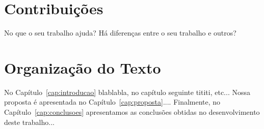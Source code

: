 \section{Contribuições}
\label{cap:introducao:sec:contribuicoes}

No que o seu trabalho ajuda? Há diferenças entre o seu trabalho e outros?

\section{Organização do Texto}
\label{cap:introducao:sec:organizacao:texto}

No Capítulo~\ref{cap:introducao} blablabla, no capítulo seguinte tititi, etc... Nossa proposta é apresentada no Capítulo~\ref{cap:proposta}.... Finalmente, no Capítulo~\ref{cap:conclusoes} apresentamos as conclusões obtidas no desenvolvimento deste trabalho...